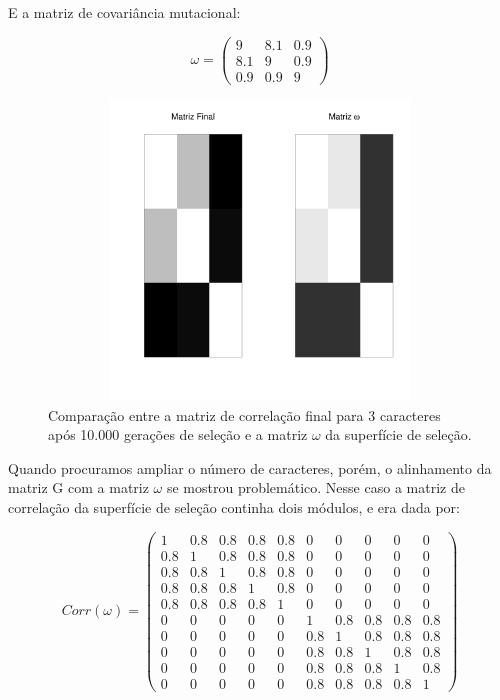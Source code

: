 E a matriz de covariância mutacional: 

\begin{equation}
\omega = \left( \begin{smallmatrix} 9 & 8.1 & 0.9\\  8.1 & 9 & 0.9 \\ 0.9 & 0.9 & 9 \end{smallmatrix}  \right)
\end{equation}


\begin{figure}[htbp]
  \centering
  \includegraphics[width=150mm, height=80mm]{figuras/Mat3tracos}
   \caption{Comparação entre a matriz de correlação final para 3
   caracteres após 10.000
   gerações de seleção e a matriz $\omega$ da superfície de seleção.}
  \label{MatJones3tracos}
\end{figure}


Quando procuramos ampliar o número de caracteres, porém, o alinhamento da
matriz G com a matriz $\omega$ se mostrou problemático. 
Nesse caso a matriz de correlação da superfície de seleção continha dois
módulos, e era dada por:

\begin{equation}
Corr(\omega) = \left( 
\begin{smallmatrix} 
1 & 0.8 & 0.8 & 0.8 & 0.8 & 0 & 0 & 0 & 0 & 0\\  
0.8 & 1 & 0.8 & 0.8 & 0.8 & 0 & 0 & 0 & 0 & 0\\  
0.8 & 0.8 & 1 & 0.8 & 0.8 & 0 & 0 & 0 & 0 & 0\\  
0.8 & 0.8 & 0.8 & 1 & 0.8 & 0 & 0 & 0 & 0 & 0\\  
0.8 & 0.8 & 0.8 & 0.8 & 1 & 0 & 0 & 0 & 0 & 0\\  
0 & 0 & 0 & 0 & 0 & 1 & 0.8 & 0.8 & 0.8 & 0.8\\ 
0 & 0 & 0 & 0 & 0 & 0.8 & 1 & 0.8 & 0.8 & 0.8\\
0 & 0 & 0 & 0 & 0 & 0.8 & 0.8 & 1 & 0.8 & 0.8\\
0 & 0 & 0 & 0 & 0 & 0.8 & 0.8 & 0.8 & 1 & 0.8\\
0 & 0 & 0 & 0 & 0 & 0.8 & 0.8 & 0.8 & 0.8 & 1
\end{smallmatrix}  \right)
\label{matw}
\end{equation}

